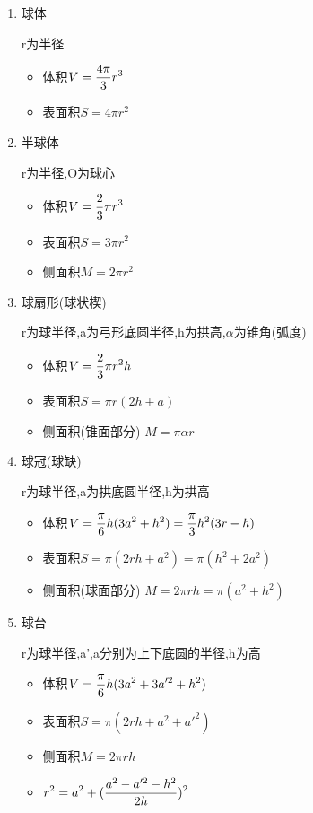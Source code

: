 \begin{enumerate}
	\item 球体
	
	r为半径
	\begin{itemize}
		\item 体积$\displaystyle V = \frac{4\pi}{3} r^3$
		\item 表面积$S =4\pi r^2$
	\end{itemize}
	
	\item 半球体
	
	r为半径,O为球心
	\begin{itemize}
		\item 体积$\displaystyle V = \frac{2}{3}\pi r^3$
		\item 表面积$S = 3\pi r^2$
		\item 侧面积$M = 2\pi r^2$
	\end{itemize}
	
	\item 球扇形(球状楔)
	
	r为球半径,a为弓形底圆半径,h为拱高,$\alpha$为锥角(弧度)
	\begin{itemize}
		\item 体积$\displaystyle V = \frac{2}{3}\pi r^2 h$
		\item 表面积$S = \pi r(2h + a)$
		\item 侧面积(锥面部分) $M = \pi \alpha r$
	\end{itemize}
	
	\item 球冠(球缺)
	
	r为球半径,a为拱底圆半径,h为拱高
	\begin{itemize}
		\item 体积$\displaystyle V = \frac{\pi}{6}h (3a^2 + h^2) = \frac{\pi}{3}h^2(3r - h)$
		\item 表面积$S = \pi (2rh + a^2) = \pi (h^2 + 2a^2)$
		\item 侧面积(球面部分) $M = 2\pi rh = \pi (a^2 + h^2)$
	\end{itemize}
	
	\item 球台
	
	r为球半径,a',a分别为上下底圆的半径,h为高
	\begin{itemize}
		\item 体积$\displaystyle V = \frac{\pi}{6}h (3a^2 + 3a'^2 + h^2)$
		\item 表面积$S = \pi (2rh + a^2 + a'^2)$
		\item 侧面积$M = 2\pi rh$
		\item $\displaystyle r^2 = a^2 + (\frac{a^2 - a'^2 - h^2}{2h})^2$
	\end{itemize}
	

\end{enumerate}
